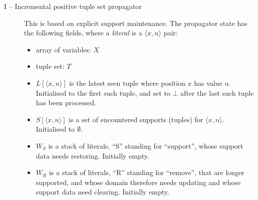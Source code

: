 \documentclass[a4paper,11pt]{article}
\newcommand{\Extensional}{\Constraint{Extensional}~}
\newcommand{\FOREACH}[1]{\FORALL{{#1} \textbf{do}}}
\newcommand{\ENDFOREACH}{\ENDFOR}
\def\PROCEDURE{\item[\textbf{PROCEDURE}]}
\def\bool{\mathit{bool}}
\def\Extensional{\textsc{Extensional}}
\numberwithin{equation}{section}
\begin{document}
\begin{description}

  \item[I -- Incremental positive tuple set propagator]
    This is based on explicit support maintenance.  The propagator state
has the following fields, where a \emph{literal} is a $\langle x,n
\rangle$ pair:

\begin{itemize}
\item array of variables: $X$
\item tuple set: $T$
\item $L[\langle x,n \rangle]$ is the latest seen tuple where position
  $x$ has value $n$.  Initialised to the first such tuple, and set to
  $\bot$ after the last such tuple has been processed.
\item $S[\langle x,n \rangle]$ is a set of encountered supports
  (tuples) for $\langle x,n \rangle$.  Initialised to $\emptyset$.
\item $W_S$ is a stack of literals, ``S'' standing for ``support'',
  whose support data needs restoring.
  Initially empty.
\item $W_R$ is a stack of literals, ``R'' standing for ``remove'', 
  that are longer supported, and whose domain therefore needs updating
  and whose support data need clearing.
  Initially empty.
\end{itemize}


\end{description}
\end{document}
